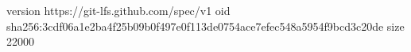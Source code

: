 version https://git-lfs.github.com/spec/v1
oid sha256:3cdf06a1e2ba4f25b09b0f497e0f113de0754ace7efec548a5954f9bcd3c20de
size 22000
